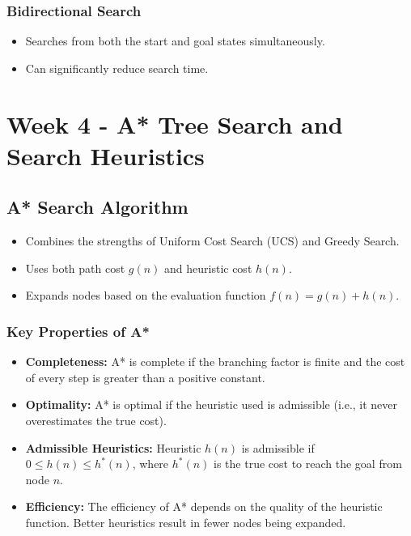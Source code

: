 \documentclass[8pt]{article}
\begin{document}
\subsubsection*{Bidirectional Search}
\begin{itemize}
    \item Searches from both the start and goal states simultaneously.
    \item Can significantly reduce search time.
\end{itemize}

\newpage
\section{Week 4 - A* Tree Search and Search Heuristics}
\subsection{A* Search Algorithm}
\begin{itemize}
    \item Combines the strengths of Uniform Cost Search (UCS) and Greedy Search.
    \item Uses both path cost \(g(n)\) and heuristic cost \(h(n)\).
    \item Expands nodes based on the evaluation function \(f(n) = g(n) + h(n)\).
\end{itemize}

\subsubsection*{Key Properties of A*}
\begin{itemize}
    \item \textbf{Completeness:} A* is complete if the branching factor is finite and the cost of every step is greater than a positive constant.
    \item \textbf{Optimality:} A* is optimal if the heuristic used is admissible (i.e., it never overestimates the true cost).
    \item \textbf{Admissible Heuristics:} Heuristic \(h(n)\) is admissible if \(0 \leq h(n) \leq h^*(n)\), where \(h^*(n)\) is the true cost to reach the goal from node \(n\).
    \item \textbf{Efficiency:} The efficiency of A* depends on the quality of the heuristic function. Better heuristics result in fewer nodes being expanded.
\end{itemize}
\end{document}
